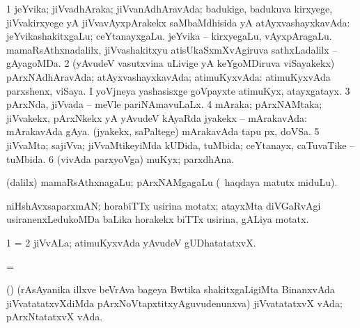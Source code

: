 {{{{{{{{{{{\bentry 
{} 
\gl{\gu}
\expl{}
\bmng
\bnum
\num{1} jeYvika; jiVvadhAraka; jiVvanAdhAravAda; badukige, badukuva kirxyege, jiVvakirxyege yA jiVvavAyxpArakekx saMbaMdhisida yA atAyxvashayxkavAda:  jeYvikashakitxgaLu; ceYtanayxgaLu.  jeYvika -- kirxyegaLu, vAyxpAragaLu.  mamaRsAthxnadalilx, jiVvashakitxyu atisUkaSxmXvAgiruva sathxLadalilx -- gAyagoMDa. 
\num{2} (yAvudeV vasutxvina uLivige yA keYgoMDiruva viSayakekx) pArxNAdhAravAda; atAyxvashayxkavAda; atimuKyxvAda:  atimuKyxvAda parxshenx, viSaya.  I yoVjneya yashasisxge goVpayxte atimuKyx, atayxgatayx. 
\num{3} pArxNda, jiVvada -- meVle pariNAmavuLaLx. 
\num{4} mAraka; pArxNAMtaka; jiVvakekx, pArxNkekx yA yAvudeV kAyaRda jyakekx -- mArakavAda:  mArakavAda gAya.  (jyakekx, saPaltege) mArakavAda tapu px, doVSa. 
\num{5} jiVvaMta; sajiVva; jiVvaMtikeyiMda kUDida, tuMbida; ceYtanayx, caTuvaTike -- tuMbida. 
\num{6} (vivAda parxyoVga) muKyx; parxdhAna. 
\enum
\emng
\eentry

\bentry 
{} 
\gl{\nA}
\expl{}
\bmng
 (\bava dalilx) mamaRsAthxnagaLu; pArxNAMgagaLu (\kanmu\ haqdaya matutx miduLu). 
\emng
\eentry

\bentry
{}
\gl{\nA}
\expl{}
\bmng
 niHshAvxsaparxmAN; horabiTTx usirina motatx; atayxMta diVGaRvAgi usiranenxLedukoMDa baLika horakekx biTTx usirina, gALiya motatx. 
\emng
\eentry

\bentry 
{}
\gl{\nA}
\expl{}
\bmng
\bnum
\num{1} =  
\num{2} jiVvALa; atimuKyxvAda yAvudeV gUDhatatatxvX. 
\enum
\emng
\eentry

\bentry
{} 
\gl{\nA}
\expl{}
\bmng
\emng
\eentry

\bentry
{} 
\gl{\sakirx}
\expl{}
\bmng
 =  
\emng
\eentry

\bentry
{} 
\gl{\nA}
\expl{}
\bmng
 (\jiVvi) (rAsAyanika illxve beVrAva bageya Bwtika shakitxgaLigiMta BinanxvAda jiVvatatatxvXdiMda pArxNoVtapxtitxyAguvudenunxva) jiVvatatatxvX vAda; pArxNtatatxvX vAda. 
\emng
\eentry

}}}}}}}}}}}
